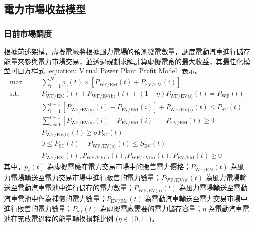 \subsection{電力市場收益模型}

\subsubsection{日前市場調度}

根據前述架構，虛擬電廠將根據風力電場的預測發電數量，調度電動汽車進行儲存能量來參與電力市場交易，並透過規劃求解計算虛擬電廠的最大收益，其最佳化模型可由方程式 \eqref{equation: Virual Power Plant Profit Model} 表示。
%
\begin{subequations}\label{equation: Virual Power Plant Profit Model}
  \begin{alignat}{2}
    \max        \qquad & \sum_{t = 1}^{N} p_{e}(t) \times [P_{\text{WF/EM}}(t) + P_{\text{EV/EM}}(t)] \label{subequation: Virual Power Plant Profit Model 1} \\
    \text{s.t.} \qquad & P_{\text{WF/EM}}(t) + P_{\text{WF/EV(b)}}(t) + (1 + \eta)P_{\text{WF/EV(s)}}(t) = P_{\text{WF}}(t) \label{subequation: Virual Power Plant Profit Model 2} \\
                       & \sum_{i=1}^{t-1} \left[ P_{\text{WF/EV(s)}}(i) - P_{\text{EV/EM}}(i) \right] + P_{\text{WF/EV(s)}}(t) \leq P_{\text{ST}}(t) \label{subequation: Virual Power Plant Profit Model 3} \\
                       & \sum_{i=1}^{t-1} \left[ P_{\text{WF/EV(s)}}(i) - P_{\text{EV/EM}}(i) \right] - P_{\text{EV/EM}}(t) \geq 0 \label{subequation: Virual Power Plant Profit Model 4} \\
                       & P_{\text{WF/EV(b)}}(t) \geq \sigma P_{\text{ST}}(t) \label{subequation: Virual Power Plant Profit Model 5} \\
                       & 0 \leq P_{\text{ST}}(t) + P_{\text{WF/EV(b)}}(t) \leq S_{\text{EV}}(t) \label{subequation: Virual Power Plant Profit Model 6} \\
                       & P_{\text{WF/EM}}(t), P_{\text{WF/EV(s)}}(t),  P_{\text{WF/EV(b)}}(t),P_{\text{EV/EM}}(t) \geq 0 \label{subequation: Virual Power Plant Profit Model 7}
  \end{alignat}
\end{subequations}
%
其中，$p_{e} (t)$ 為虛擬電廠在電力交易市場中的販售電力價格；$P_{\text{WF/EM}}(t)$ 為風力電場輸送至電力交易市場中進行販售的電力數量；$P_{\text{WF/EV(s)}}(t)$ 為風力電場輸送至電動汽車電池中進行儲存的電力數量；$P_{\text{WF/EV(b)}}(t)$ 為風力電場輸送至電動汽車電池中作為補償的電力數量；$P_{\text{EV/EM}}(t)$ 為電動汽車輸送至電力交易市場中進行販售的電力數量；$P_{\text{ST}}(t)$ 為虛擬電廠需要的電力儲存容量；$\eta$ 為電動汽車電池在充放電過程的能量轉換損耗比例 ($\eta \in [0, 1]$)。

